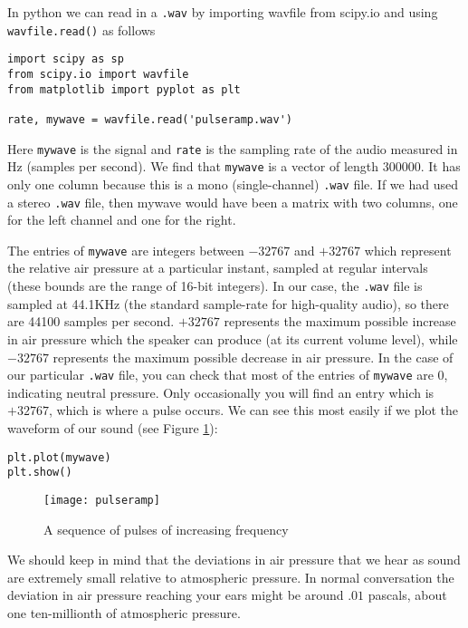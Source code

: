 In python we can read in a \texttt{.wav} by importing wavfile from scipy.io and using \texttt{wavfile.read()} as follows
\begin{lstlisting}
import scipy as sp
from scipy.io import wavfile
from matplotlib import pyplot as plt

rate, mywave = wavfile.read('pulseramp.wav')
\end{lstlisting}
Here \texttt{mywave} is the signal and \texttt{rate} is the sampling rate of the audio measured in Hz (samples per second).
%
We find that \texttt{mywave} is a vector of length $300000$.
It has only one column because this is a mono (single-channel) \texttt{.wav} file.
If we had used a stereo \texttt{.wav} file, then mywave would have been a matrix with two columns, one for the left channel and one for the right.

The entries of \texttt{mywave} are integers between $-32767$ and $+32767$ which represent the relative air pressure at a particular instant, sampled at regular intervals (these bounds are the range of 16-bit integers).
In our case, the \texttt{.wav} file is sampled at 44.1KHz (the standard sample-rate for high-quality audio), so there are 44100 samples per second.
$+32767$ represents the maximum possible increase in air pressure which the speaker can produce (at its current volume level), while $-32767$ represents the maximum possible decrease in air pressure.
In the case of our particular \texttt{.wav} file, you can check that most of the entries of \texttt{mywave} are $0$, indicating neutral pressure.
Only occasionally you will find an entry which is $+32767$, which is where a pulse occurs.
We can see this most easily if we plot the waveform of our sound (see Figure \ref{pulseramp}):
\begin{lstlisting}
plt.plot(mywave)
plt.show()
\end{lstlisting}
\begin{figure}[ht]\caption{A sequence of pulses of increasing frequency}\label{pulseramp}\centering\texttt{[image: pulseramp]}\end{figure}

We should keep in mind that the deviations in air pressure that we hear as sound are extremely small relative to atmospheric pressure.
In normal conversation the deviation in air pressure reaching your ears might be around $.01$ pascals, about one ten-millionth of atmospheric pressure.


